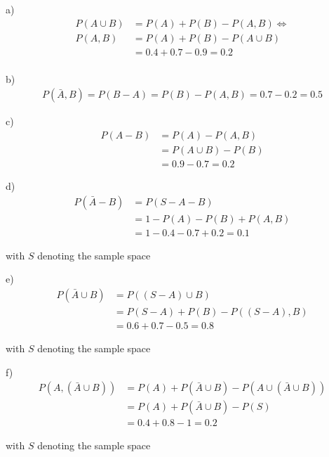 a)
\begin{align*}
  P(A \cup B) &= P(A) + P(B) - P(A,B) \Leftrightarrow \\
  P(A,B) &= P(A) + P(B) - P(A \cup B) \\
         &= 0.4 + 0.7 - 0.9 = 0.2 \\
\end{align*}

b)
\begin{align*}
  P(\bar{A}, B) = P(B-A) = P(B) - P(A,B) = 0.7 - 0.2 = 0.5
\end{align*}

c)
\begin{align*}
  P(A-B) &= P(A) - P(A,B) \\
         &= P(A \cup B) - P(B) \\
         &= 0.9 - 0.7 = 0.2
\end{align*}

d)
\begin{align*}
  P(\bar{A} - B) &= P(S - A - B) \\
                 &= 1 - P(A) - P(B) + P(A,B) \\
                 &= 1 - 0.4 - 0.7 + 0.2 = 0.1
\end{align*}

with $S$ denoting the sample space

e)
\begin{align*}
  P(\bar{A} \cup B) &= P((S-A) \cup B) \\
                    &= P(S-A) + P(B) - P((S-A),B) \\
                    &= 0.6 + 0.7 - 0.5 = 0.8
\end{align*}

with $S$ denoting the sample space

f)
\begin{align*}
  P(A, (\bar{A} \cup B)) &= P(A) + P(\bar{A} \cup B) - P(A \cup (\bar{A} \cup B)) \\
                         &= P(A) + P(\bar{A} \cup B) - P(S) \\
                         &= 0.4 + 0.8 - 1 = 0.2
\end{align*}

with $S$ denoting the sample space
